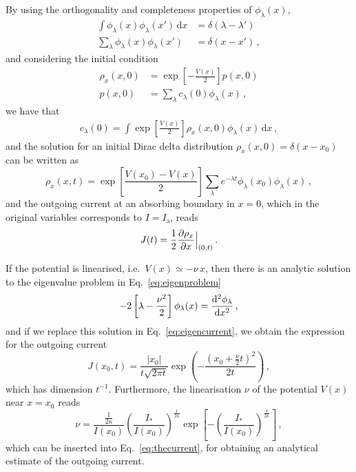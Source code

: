 By using the orthogonality and completeness properties of $\phi_\lambda(x)$,
\begin{align}
    \int \phi_\lambda(x)\phi_\lambda(x')\,\mathrm{d}x &= \delta(\lambda - \lambda')\\
    \sum_\lambda \phi_\lambda(x)\phi_\lambda(x') &= \delta(x-x')\,,
\end{align}
and considering the initial condition
\begin{align}
    \rho_x(x,0) &= \exp\left[-\frac{V(x)}{2}\right] p(x,0) \\
    p(x,0) &= \sum_\lambda c_\lambda(0) \phi_\lambda(x)\,, \label{eq:mid_step_analytic}
\end{align}
we have that
\begin{align}
    c_\lambda(0) = \int \exp\left[\frac{V(x)}{2}\right] \rho_x(x,0)\phi_\lambda(x)\, \mathrm{d}x\,,
    \label{eq:c_lambda_zero}
\end{align}
and the solution for an initial Dirac delta distribution $\rho_x(x, 0)=\delta(x-x_0)$ can be written as
\begin{equation}
    \rho_x(x,t)=\exp\left[\frac{V(x_0)-V(x)}{2}\right]\sum_\lambda e^{-\lambda t}\phi_\lambda(x_0)\phi_\lambda(x)\, ,
\end{equation}
and the outgoing current at an absorbing boundary in $x=0$, which in the original variables corresponds to $I=I_\mathrm{a}$, reads
\begin{equation}
    J(t) = \frac{1}{2}\pdv{\rho_x}{x}\Bigr|_{(0,t)}     \, .
    \label{eq:eigencurrent}
\end{equation}

If the potential is linearised, i.e.\ $V(x)\simeq -\nu \, x$, then there is an analytic solution to the eigenvalue problem in Eq.~\eqref{eq:eigenproblem}
\begin{equation}
    -2\left[\lambda-\frac{\nu^2}{2}\right]\phi_\lambda(x)=\dv[2]{\phi_\lambda}{x}\, ,
\end{equation}
and if we replace this solution in Eq.~\eqref{eq:eigencurrent}, we obtain the expression for the outgoing current
\begin{equation}
    J(x_0, t) = \frac{|x_0|}{t\sqrt{2\pi t}}\exp\left(-\frac{(x_0+\frac{\nu}{2}t)^2}{2t}\right) \,,
    \label{eq:out_current}
\end{equation}
which has dimension $t^{-1}$. Furthermore, the linearisation $\nu$ of the potential $V(x)$ near $x=x_0$ reads
\begin{equation}
    \nu=\frac{\frac{1}{2\kappa}}{I(x_0)}\left(\frac{I_\ast}{I(x_0)}\right)^{\frac{1}{2\kappa}}\exp\left[-\left(\frac{I_\ast}{I(x_0)}\right)^{\frac{1}{2\kappa}}\right]\,,
\end{equation}
which can be inserted into Eq.~\eqref{eq:thecurrent}, for obtaining an analytical estimate of the outgoing current.

